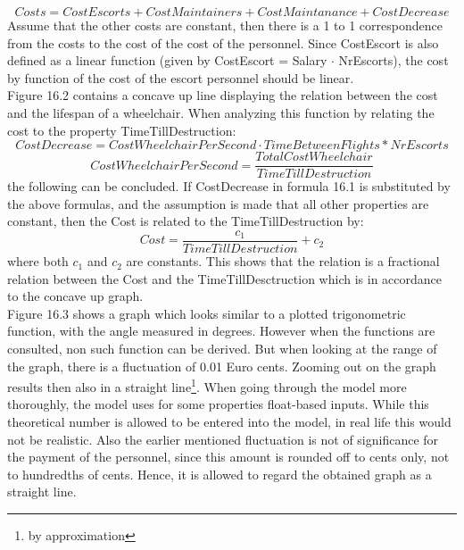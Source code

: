 \documentclass[a4paper, 11pt, notitlepage]{report}
\begin{document}
\begin{equation}
Costs = CostEscorts + CostMaintainers + CostMaintanance + CostDecrease
\end{equation}
Assume that the other costs are constant, then there is a 1 to 1 correspondence from the costs to the cost of the cost of the personnel. Since CostEscort is also defined as a linear function (given by CostEscort = Salary $\cdot$ NrEscorts), the cost by function of the cost of the escort personnel should be linear. \\
Figure 16.2 contains a concave up line displaying the relation between the cost and the lifespan of a wheelchair. When analyzing this function by relating the cost to the property TimeTillDestruction:
\begin{equation}
CostDecrease = CostWheelchairPerSecond \cdot TimeBetweenFlights*NrEscorts
\end{equation}
\begin{equation}
CostWheelchairPerSecond= \frac{TotalCostWheelchair}{TimeTillDestruction}
\end{equation}
the following can be concluded. If CostDecrease in formula 16.1 is substituted by the above formulas, and the assumption is made that all other properties are constant, then the Cost is related to the TimeTillDestruction by:
\begin{equation}
Cost = \frac{c_1}{TimeTillDestruction}+ c_2
\end{equation}
where both $c_1$ and $c_2$ are constants. This shows that the relation is a fractional relation between the Cost and the TimeTillDesctruction which is in accordance to the concave up graph.\\
Figure 16.3 shows a graph which looks similar to a plotted trigonometric function, with the angle measured in degrees. However when the functions are consulted, non such function can be derived. But when looking at the range of the graph, there is a fluctuation of 0.01 Euro cents. Zooming out on the graph results then also in a straight line\footnote{by approximation}. When going through the model more thoroughly, the model uses for some properties float-based inputs. While this theoretical number is allowed to be entered into the model, in real life this would not be realistic. Also the earlier mentioned fluctuation is not of significance for the payment of the personnel, since this amount is rounded off to cents only, not to hundredths of cents. Hence, it is allowed to regard the obtained graph as a straight line.
\clearpage
\end{document}

